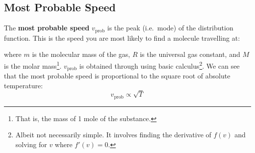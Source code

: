 \subsection{Most Probable Speed}
%  
%    
The \textbf{most probable speed} $v_\text{prob}$ is the peak (i.e.\ mode) of the
distribution function. This is the speed you are most likely to find a molecule
travelling at:
%
  
where $m$ is the molecular mass of the gas, $R$ is the universal gas constant,
and $M$ is the molar mass\footnote{That is, the mass of 1 mole of the
substance.}. $v_\text{prob}$ is obtained through using basic
calculus\footnote{Albeit not necessarily simple. It involves finding the
derivative of $f(v)$ and solving for $v$ where $f'(v)=0$.}. We can see that
the most probable speed is proportional to the square root of absolute
temperature:
\begin{equation}  
  v_\text{prob}\propto\sqrt T
\end{equation}


